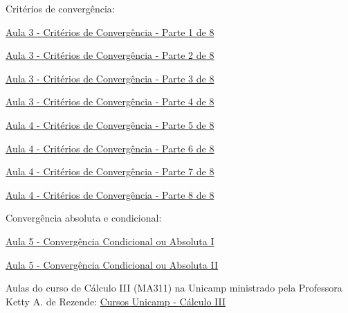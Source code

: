 Critérios de convergência:
\begin{listlinks}
  \item \href{https://www.youtube.com/watch?v=d_U9WfFXTXY&list=PLxI8Can9yAHeOiMYCBlkyCALloROQ58OY&index=10&t=0s}{Aula 3 - Critérios de Convergência - Parte 1 de 8}
  \item \href{https://www.youtube.com/watch?v=IqnYmacgmpY&list=PLxI8Can9yAHeOiMYCBlkyCALloROQ58OY&index=11&t=0s}{Aula 3 - Critérios de Convergência - Parte 2 de 8}
  \item \href{https://www.youtube.com/watch?v=jC9MWU3VrsU&list=PLxI8Can9yAHeOiMYCBlkyCALloROQ58OY&index=12&t=0s}{Aula 3 - Critérios de Convergência - Parte 3 de 8}
  \item \href{https://www.youtube.com/watch?v=UOoV1FX5oO8&list=PLxI8Can9yAHeOiMYCBlkyCALloROQ58OY&index=13&t=0s}{Aula 3 - Critérios de Convergência - Parte 4 de 8}
  \item \href{https://www.youtube.com/watch?v=F_Mx__unOeM&list=PLxI8Can9yAHeOiMYCBlkyCALloROQ58OY&index=14&t=0s}{Aula 4 - Critérios de Convergência - Parte 5 de 8}
  \item \href{https://www.youtube.com/watch?v=XZeLekfACKs&list=PLxI8Can9yAHeOiMYCBlkyCALloROQ58OY&index=15&t=0s}{Aula 4 - Critérios de Convergência - Parte 6 de 8}
  \item \href{https://www.youtube.com/watch?v=o0fS-j0BYqg&list=PLxI8Can9yAHeOiMYCBlkyCALloROQ58OY&index=16&t=0s}{Aula 4 - Critérios de Convergência - Parte 7 de 8}
  \item \href{https://www.youtube.com/watch?v=5x24l90oZFk&list=PLxI8Can9yAHeOiMYCBlkyCALloROQ58OY&index=17&t=0s}{Aula 4 - Critérios de Convergência - Parte 8 de 8}
\end{listlinks}

Convergência absoluta e condicional:
\begin{listlinks}
  \item \href{https://www.youtube.com/watch?v=PPu7D3bIwsc&list=PLxI8Can9yAHeOiMYCBlkyCALloROQ58OY&index=18&t=0s}{Aula 5 - Convergência Condicional ou Absoluta I}
  \item \href{https://www.youtube.com/watch?v=UGD6c-3whJA&list=PLxI8Can9yAHeOiMYCBlkyCALloROQ58OY&index=19&t=0s}{Aula 5 - Convergência Condicional ou Absoluta II}
\end{listlinks}

Aulas do curso de Cálculo III (MA311) na Unicamp ministrado pela Professora Ketty A. de Rezende:
\href{https://www.youtube.com/playlist?list=PLFBA21F349930F92F}{Cursos Unicamp - Cálculo III}

